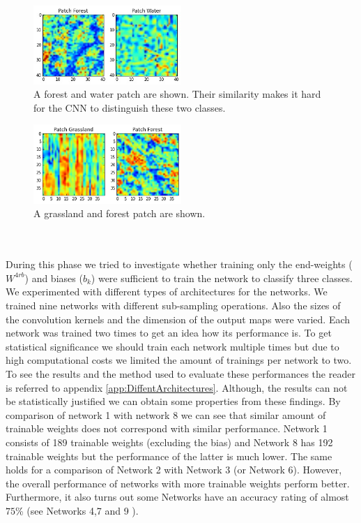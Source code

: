 \documentclass[a4paper,onecolumn]{report}
\begin{document}
\\\\
\begin{figure}[bth]
	\centering
	\includegraphics[width=0.5\textwidth]{./images/WaterForestPatch.jpg}
	\caption{A forest and water patch are shown. Their similarity makes it hard for the CNN to distinguish these two classes.}
	\label{fig:WaterForestPatch}
\end{figure}
\begin{figure}[bth]
	\centering
	\includegraphics[width=0.5\textwidth] {./images/GrassForestPatch.jpg}
	\caption{A grassland and forest patch are shown.}
	\label{fig:GrassForestPatch}
\end{figure}
\\\\
During this phase we tried to investigate whether training only the end-weights ($W^{4rb}$) and biases ($b_{k}$) were sufficient to train the network to classify three classes. We experimented with different types of architectures for the networks. We trained nine networks with different sub-sampling operations. Also the sizes of the convolution kernels and the dimension of the output maps were varied. Each network was trained two times to get an idea how its performance is. To get statistical significance we should train each network multiple times but due to high computational costs we limited the amount of trainings per network to two. To see the results and the method used to evaluate these performances the reader is referred to appendix \ref{app:DiffentArchitectures}. Although, the results can not be statistically justified we can obtain some properties from these findings. By comparison of network 1 with network 8 we can see that similar amount of trainable weights does not correspond with similar performance. Network 1 consists of 189 trainable weights (excluding the bias) and Network 8 has 192  trainable weights but the performance of the latter is much lower. The same holds for a comparison of Network 2 with Network 3 (or Network 6). However, the overall performance of networks with more trainable weights perform better. Furthermore, it also turns out some Networks have an accuracy rating of almost $75$\% (see Networks 4,7 and 9 ). 
\end{document}
